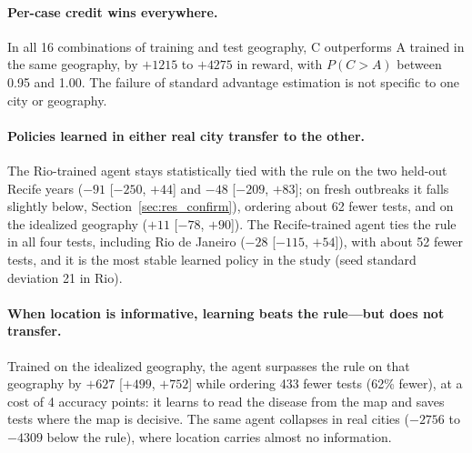 \documentclass[11pt,a4paper]{article}
\begin{document}
\paragraph{Per-case credit wins everywhere.} In all 16 combinations of training and test geography, C outperforms A trained in the same geography, by $+1215$ to $+4275$ in reward, with $P(C > A)$ between 0.95 and 1.00. The failure of standard advantage estimation is not specific to one city or geography.

\paragraph{Policies learned in either real city transfer to the other.} The Rio-trained agent stays statistically tied with the rule on the two held-out Recife years ($-91$ [$-250$, $+44$] and $-48$ [$-209$, $+83$]; on fresh outbreaks it falls slightly below, Section~\ref{sec:res_confirm}), ordering about 62 fewer tests, and on the idealized geography ($+11$ [$-78$, $+90$]). The Recife-trained agent ties the rule in all four tests, including Rio de Janeiro ($-28$ [$-115$, $+54$]), with about 52 fewer tests, and it is the most stable learned policy in the study (seed standard deviation 21 in Rio).

\paragraph{When location is informative, learning beats the rule---but does not transfer.} Trained on the idealized geography, the agent surpasses the rule on that geography by $+627$ [$+499$, $+752$] while ordering 433 fewer tests (62\% fewer), at a cost of 4 accuracy points: it learns to read the disease from the map and saves tests where the map is decisive. The same agent collapses in real cities ($-2756$ to $-4309$ below the rule), where location carries almost no information.
\end{document}
